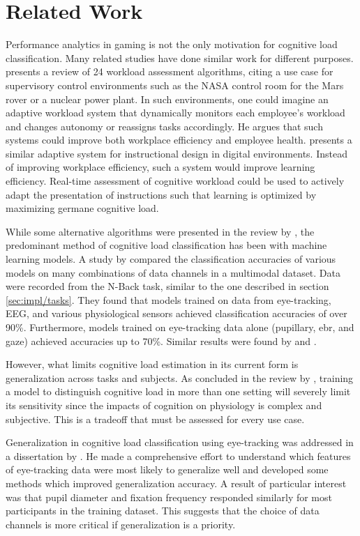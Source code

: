 \section{Related Work} \label{sec:bt/previous_work}

Performance analytics in gaming is not the only motivation for cognitive load classification. Many related studies have done similar work for different purposes. \textcite{heard2018} presents a review of 24 workload assessment algorithms, citing a use case for supervisory control environments such as the NASA control room for the Mars rover or a nuclear power plant. In such environments, one could imagine an adaptive workload system that dynamically monitors each employee's workload and changes autonomy or reassigns tasks accordingly. He argues that such systems could improve both workplace efficiency and employee health. \textcite{gerjets2014} presents a similar adaptive system for instructional design in digital environments. Instead of improving workplace efficiency, such a system would improve learning efficiency. Real-time assessment of cognitive workload could be used to actively adapt the presentation of instructions such that learning is optimized by maximizing germane cognitive load.

While some alternative algorithms were presented in the review by \textcite{heard2018}, the predominant method of cognitive load classification has been with machine learning models. A study by \textcite{hogervorst2014} compared the classification accuracies of various models on many combinations of data channels in a multimodal dataset. Data were recorded from the N-Back task, similar to the one described in section \ref{sec:impl/tasks}. They found that models trained on data from eye-tracking, EEG, and various physiological sensors achieved classification accuracies of over 90\%. Furthermore, models trained on eye-tracking data alone (pupillary, \acrshort{ebr}, and gaze) achieved accuracies up to 70\%. Similar results were found by \textcite{lobo2016} and \textcite{wilson2010}.

However, what limits cognitive load estimation in its current form is generalization across tasks and subjects. As concluded in the review by \textcite{heard2018}, training a model to distinguish cognitive load in more than one setting will severely limit its sensitivity since the impacts of cognition on physiology is complex and subjective. This is a tradeoff that must be assessed for every use case. 

Generalization in cognitive load classification using eye-tracking was addressed in a dissertation by \textcite{appel2021}. He made a comprehensive effort to understand which features of eye-tracking data were most likely to generalize well and developed some methods which improved generalization accuracy. A result of particular interest was that pupil diameter and fixation frequency responded similarly for most participants in the training dataset. This suggests that the choice of data channels is more critical if generalization is a priority.